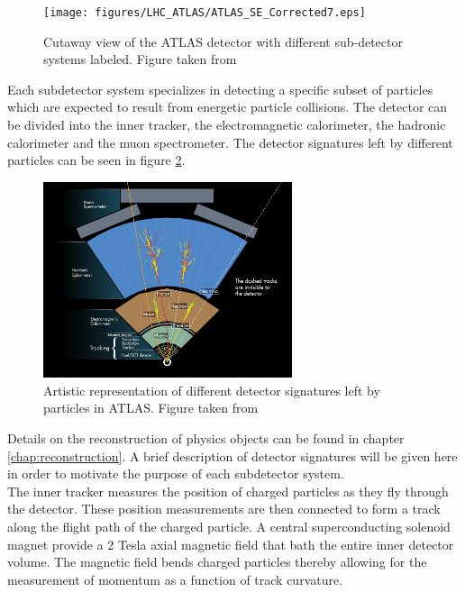 \begin{figure}[h!]
\centering
\texttt{[image: figures/LHC\_ATLAS/ATLAS\_SE\_Corrected7.eps]}
\caption{ Cutaway view of the ATLAS detector with different sub-detector systems labeled. Figure taken from \cite{ATLAS_JINST} \label{LHC:fig:ATLASDet}}
\end{figure}

\indent Each subdetector system specializes in detecting a specific subset of particles which are expected to result from energetic particle collisions.  The detector can be divided into the inner tracker, the electromagnetic calorimeter, the hadronic calorimeter and the muon spectrometer.  The detector signatures left by different particles can be seen in figure \ref{LHC:fig:ATLASSig}. \\

\begin{figure}[h!]
\centering
\includegraphics[width=0.65\textwidth, angle=0]{figures/LHC_ATLAS/ATLAS_Signature.jpg}
\caption{ Artistic representation of different detector signatures left by particles in ATLAS. Figure taken from \cite{ATLASSig} \label{LHC:fig:ATLASSig}}
\end{figure}

\indent Details on the reconstruction of physics objects can be found in chapter \ref{chap:reconstruction}.  A brief description of detector signatures will be given here in order to motivate the purpose of each subdetector system. \\

\indent The inner tracker measures the position of charged particles as they fly through the detector.  These position measurements are then connected to form a track along the flight path of the charged particle.  A central superconducting solenoid magnet provide a 2 Tesla axial magnetic field that bath the entire inner detector volume.  The magnetic field bends charged particles thereby allowing for the measurement of momentum as a function of track curvature.  \\

